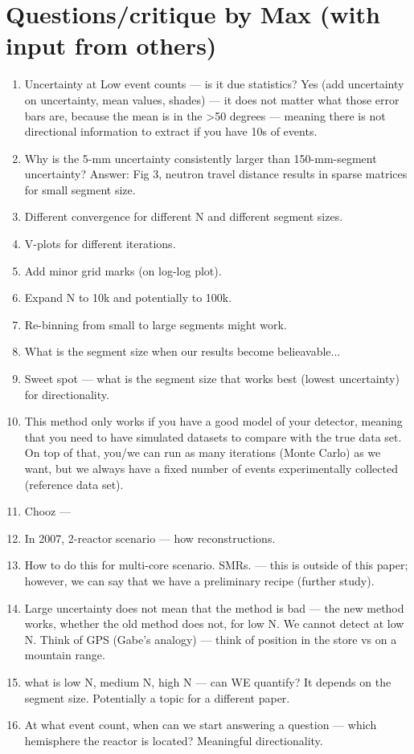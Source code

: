 
\section{Questions/critique by Max (with input from others)}

\begin{enumerate}
    \item Uncertainty at Low event counts --- is it due statistics? Yes (add uncertainty on uncertainty, mean values, shades) --- it does not matter what those error bars are, because the mean is in the >50 degrees --- meaning there is not directional information to extract if you have 10s of events.
    \item Why is the 5-mm uncertainty consistently larger than 150-mm-segment uncertainty? Answer: Fig 3, neutron travel distance results in sparse matrices for small segment size.
    \item Different convergence for different N and different segment sizes.
    \item V-plots for different iterations.
    \item Add minor grid marks (on log-log plot).
    \item Expand N to 10k and potentially to 100k.
    \item Re-binning from small to large segments might work.
    \item What is the segment size when our results become belieavable...
    \item Sweet spot --- what is the segment size that works best (lowest uncertainty) for directionality.
    \item This method only works if you have a good model of your detector, meaning that you need to have simulated datasets to compare with the true data set. On top of that, you/we can run as many iterations (Monte Carlo) as we want, but we always have a fixed number of events experimentally collected (reference data set).
    \item Chooz --- 
    \item In 2007, 2-reactor scenario --- how reconstructions.
    \item How to do this for multi-core scenario. SMRs. --- this is outside of this paper; however, we can say that we have a preliminary recipe (further study).
    \item Large uncertainty does not mean that the method is bad --- the new method works, whether the old method does not, for low N. We cannot detect at low N. Think of GPS (Gabe's analogy) --- think of position in the store vs on a mountain range.
   \item what is low N, medium N, high N --- can WE quantify? It depends on the segment size. Potentially a topic for a different paper.
   \item At what event count, when can we start answering a question --- which hemisphere the reactor is located? Meaningful directionality.
\end{enumerate}

